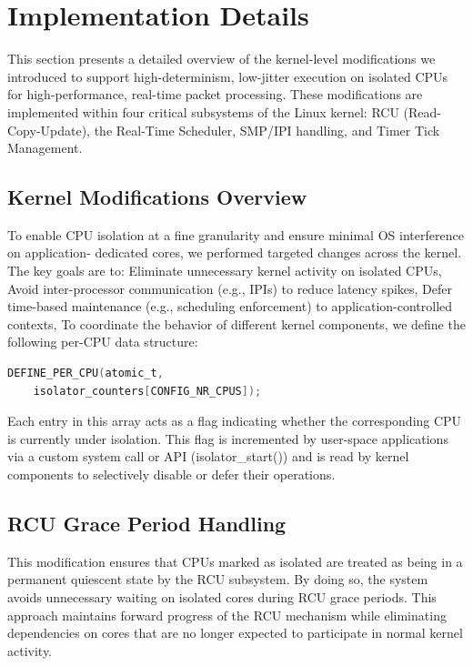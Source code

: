 \documentclass[letterpaper]{article}
\begin{document}
\section{Implementation Details}
This section presents a detailed overview of the kernel-level modifications we introduced to
support high-determinism, low-jitter execution on isolated CPUs for high-performance, real-time
packet processing. These modifications are implemented within four critical subsystems of the
Linux kernel: RCU (Read-Copy-Update), the Real-Time Scheduler, SMP/IPI handling, and Timer Tick
Management. 

\subsection{Kernel Modifications Overview}
To enable CPU isolation at a fine granularity and ensure minimal OS interference on application-
dedicated cores, we performed targeted changes across the kernel. The key goals are to:
Eliminate unnecessary kernel activity on isolated CPUs,
Avoid inter-processor communication (e.g., IPIs) to reduce latency spikes,
Defer time-based maintenance (e.g., scheduling enforcement) to application-controlled contexts,
To coordinate the behavior of different kernel components, we define the following per-CPU data
structure:

\begin{lstlisting}[language=C, caption={Per-CPU isolator counter definition}]
DEFINE_PER_CPU(atomic_t,
    isolator_counters[CONFIG_NR_CPUS]);
\end{lstlisting}
Each entry in this array acts as a flag indicating whether the corresponding CPU is currently under
isolation. This flag is incremented by user-space applications via a custom system call or API
(isolator\_start()) and is read by kernel components to selectively disable or defer their operations.


\subsection{RCU Grace Period Handling}
This modification ensures that CPUs marked as isolated are treated as being in a permanent
quiescent state by the RCU subsystem. By doing so, the system avoids unnecessary waiting on
isolated cores during RCU grace periods. This approach maintains forward progress of the RCU
mechanism while eliminating dependencies on cores that are no longer expected to participate in
normal kernel activity.
\end{document}
